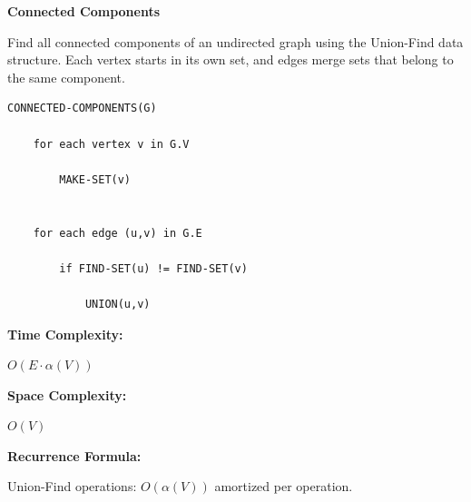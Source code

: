 \documentclass[a4paper,12pt]{article}
\begin{document}
\begin{tcolorbox}[
    colback=gray!30,
    colframe=black,
    boxrule=1pt,
    arc=0mm
]

\begin{tcolorbox}[
    colback=gray!10,
    colframe=black,
    arc=0mm
]
\centering
{\Huge\bfseries Connected Components}
\end{tcolorbox}


\begin{tcolorbox}[
    colback=gray!10,
    colframe=black,
    arc=0mm
]
\small
Find all connected components of an undirected graph using the
Union-Find data structure. Each vertex starts in its own set, and edges
merge sets that belong to the same component.
\end{tcolorbox}


\begin{tcolorbox}[
    colback=black!5,
    colframe=black,
    arc=0mm,
    title=Pseudo-code
]
\tiny
\begin{lstlisting}
CONNECTED-COMPONENTS(G)

    for each vertex v in G.V

        MAKE-SET(v)


    for each edge (u,v) in G.E

        if FIND-SET(u) != FIND-SET(v)

            UNION(u,v)
\end{lstlisting}
\end{tcolorbox}


\begin{tcolorbox}[
    colback=cyan!20,
    colframe=black,
    arc=0mm
]
\small
\textbf{Time Complexity:}

$O(E \cdot \alpha(V))$
\end{tcolorbox}


\begin{tcolorbox}[
    colback=violet!20,
    colframe=black,
    arc=0mm
]
\small
\textbf{Space Complexity:}

$O(V)$
\end{tcolorbox}


\begin{tcolorbox}[
    colback=pink!20,
    colframe=black,
    arc=0mm
]
\small
\textbf{Recurrence Formula:}

Union-Find operations:
$O(\alpha(V))$ amortized per operation.
\end{tcolorbox}

\end{tcolorbox}
\end{document}
